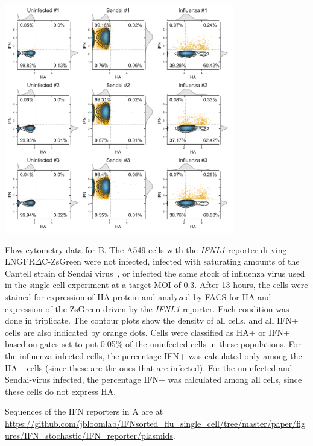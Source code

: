 \documentclass[9pt,lineno]{template}
\begin{document}
\begin{suppfig}
\includegraphics[width=0.75\textwidth]{figures/IFN_stochastic/Flow/flow_plot.pdf}
\caption{Flow cytometry data for B.
The A549 cells with the \textit{IFNL1} reporter driving LNGFR$\Delta$C-ZsGreen were not infected, infected with saturating amounts of the Cantell strain of Sendai virus~\citep{strahle2006sendai}, or infected the same stock of influenza virus used in the single-cell experiment at a target MOI of 0.3.
After 13 hours, the cells were stained for expression of HA protein and analyzed by FACS for HA and expression of the ZsGreen driven by the \textit{IFNL1} reporter.
Each condition was done in triplicate.
The contour plots show the density of all cells, and all IFN+ cells are also indicated by orange dots.
Cells were classified as HA+ or IFN+ based on gates set to put 0.05\% of the uninfected cells in these populations.
For the influenza-infected cells, the percentage IFN+ was calculated only among the HA+ cells (since these are the ones that are infected).
For the uninfected and Sendai-virus infected, the percentage IFN+ was calculated among all cells, since these cells do not express HA.
}
\label{suppfig:flow}
\end{suppfig}

\clearpage

\begin{suppfile}
\caption{Sequences of the IFN reporters in A are at \url{https://github.com/jbloomlab/IFNsorted_flu_single_cell/tree/master/paper/figures/IFN_stochastic/IFN_reporter/plasmids}.
}
\label{suppfile:reporter_sequences}
\end{suppfile}
\end{document}

